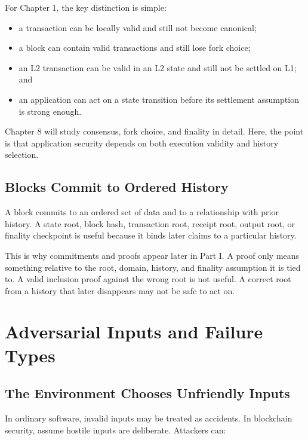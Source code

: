 For Chapter 1, the key distinction is simple:

\begin{itemize}
\item a transaction can be locally valid and still not become canonical;
\item a block can contain valid transactions and still lose fork choice;
\item an L2 transaction can be valid in an L2 state and still not be settled on L1; and
\item an application can act on a state transition before its settlement assumption is strong enough.
\end{itemize}

Chapter 8 will study consensus, fork choice, and finality in detail. Here, the point is that application security depends on both execution validity and history selection.

\subsection{Blocks Commit to Ordered History}

A block commits to an ordered set of data and to a relationship with prior history. A state root, block hash, transaction root, receipt root, output root, or finality checkpoint is useful because it binds later claims to a particular history.

This is why commitments and proofs appear later in Part I. A proof only means something relative to the root, domain, history, and finality assumption it is tied to. A valid inclusion proof against the wrong root is not useful. A correct root from a history that later disappears may not be safe to act on.

\section{Adversarial Inputs and Failure Types}

\subsection{The Environment Chooses Unfriendly Inputs}

In ordinary software, invalid inputs may be treated as accidents. In blockchain security, assume hostile inputs are deliberate. Attackers can:

